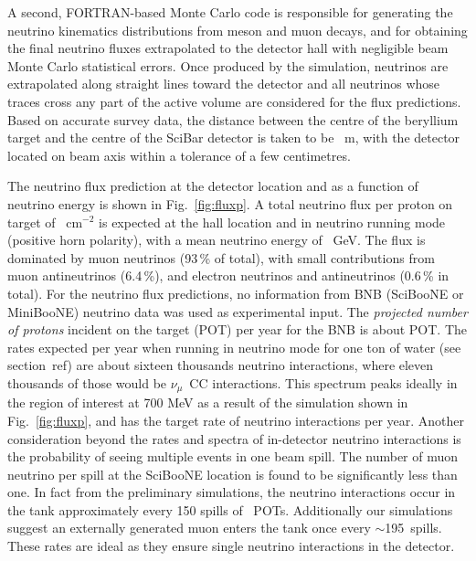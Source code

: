  A second, FORTRAN-based Monte Carlo code is responsible for generating the neutrino %
 kinematics distributions from meson and muon decays, and for obtaining the final neutrino %
 fluxes extrapolated to the detector hall with negligible beam Monte Carlo statistical errors. 
 Once produced by the simulation, neutrinos are extrapolated along straight lines %
 toward the detector and all neutrinos whose traces cross any part of the active volume are %
 considered for the flux predictions.
 Based on accurate survey data, the distance between the centre of the beryllium %
 target and the centre of the SciBar detector is taken to be ~m, %
 with the detector located on beam axis within a tolerance of a few centimetres. 
 
 The neutrino flux prediction at the detector location and as a function %
 of neutrino energy is shown in Fig.~\ref{fig:fluxp}.
 A total neutrino flux per proton on target of ~cm$^{-2}$ is expected at the %
 hall location and in neutrino running mode (positive horn polarity), with %
 a mean neutrino energy of ~GeV. 
 The flux is dominated by muon neutrinos (93\,\% of total), with small contributions from %
 muon antineutrinos (6.4\,\%), and electron neutrinos and antineutrinos (0.6\,\% in total). 
 For the neutrino flux predictions, no information from BNB %
 (SciBooNE or MiniBooNE) neutrino data was used as experimental input.
 The \emph{projected number of protons} incident on the target (POT) per year for the BNB %
 is about  POT.
 The rates expected per year when running in neutrino mode for one ton of water %
 (see section~ref) are about sixteen thousands neutrino interactions, %
 where eleven thousands of those would be $\nu_\mu$~CC interactions. 
 This spectrum peaks ideally in the region of interest at 700 MeV as a result of the simulation %
 shown in Fig.~\ref{fig:fluxp}, and has the target rate of neutrino interactions per year.
 Another consideration beyond the rates and spectra of in-detector neutrino interactions %
 is the probability of seeing multiple events in one beam spill. 
 The number of muon neutrino per spill at the SciBooNE location is found to be significantly %
 less than one.
 In fact from the preliminary simulations, the neutrino interactions occur%
 in the tank approximately every 150 spills of ~POTs. 
 Additionally our simulations suggest an externally generated muon enters the tank once %
 every $\sim$195~spills. 
 These rates are ideal as they ensure single neutrino interactions in the detector.
 
